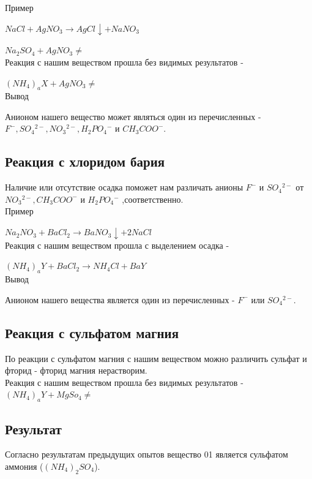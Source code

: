 \documentclass[a4paper,14pt,notitlepage,twoside]{article}
\begin{document}
            Пример

            $NaCl + AgNO_3 \to AgCl\downarrow + NaNO_3$
            \par$Na_2SO_4 + AgNO_3 \ne$\\

            Реакция с нашим веществом прошла без видимых результатов -
            \par$(NH_4)_aX + AgNO_3 \ne$\\


            Вывод

            Анионом нашего вещество может являться один из перечисленных -
            $F^-, SO_4{}^{2-}, NO_3{}^{2-}, H_2PO_4{}^-$ и $CH_3COO^-$.

        \newpage
        \subsection{Реакция с хлоридом бария}
            Наличие или отсутствие осадка поможет нам различать анионы\newline
            $F^-$ и $SO_4{}^{2-}$ от $NO_3{}^{2-}, CH_3COO^-$ и $H_2PO_4{}^-$
            ,соответственно.\\

            Пример
            \par$Na_2NO_3 + BaCl_2 \to BaNO_3\downarrow + 2NaCl$\\

            Реакция с нашим веществом прошла с выделением осадка - 

            $(NH_4)_aY + BaCl_2 \to NH_4Cl + BaY$\\

            Вывод

            Анионом нашего вещества является один из перечисленных - \newline
            $F^-$ или $SO_4{}^{2-}$.

        \subsection{Реакция с сульфатом магния}
             По реакции с сульфатом магния с нашим веществом можно различить сульфат
             и фторид - фторид магния нерастворим.\\

             Реакция с нашим веществом прошла без видимых результатов - 
             $(NH_4)_aY + MgSo_4 \ne$

        \subsection{Результат}
            Согласно результатам предыдущих опытов вещество 01 является сульфатом
            аммония ($(NH_4)_2SO_4$).
\end{document}
